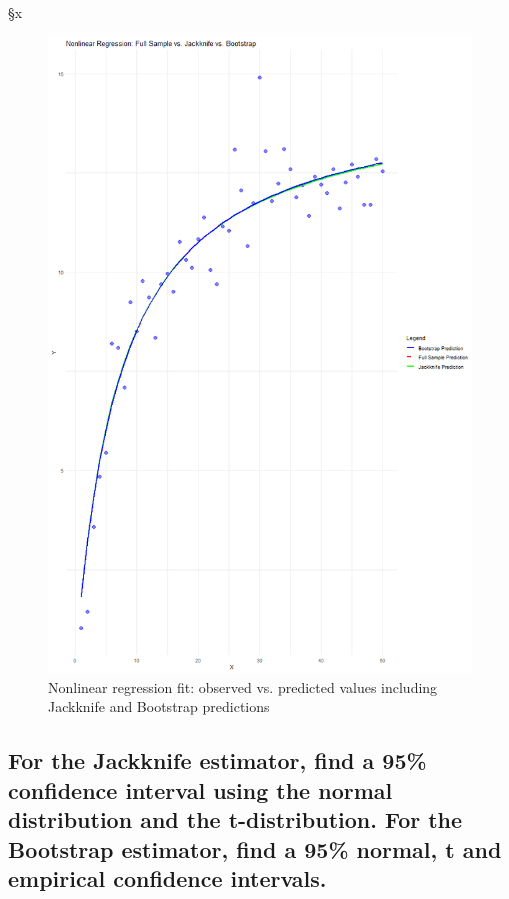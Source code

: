 §x\documentclass[]{article}
\begin{document}
\begin{figure}[H]
	\centering
	\includegraphics[width=0.7\linewidth]{img/img-4-1-2}
	\caption{Nonlinear regression fit: observed vs. predicted values including Jackknife and Bootstrap predictions}
	\label{fig:img-4-1-2}
\end{figure}

\subsection{For the Jackknife estimator, find a 95\% confidence interval using the normal distribution and the t-distribution. For the Bootstrap estimator, find a 95\% normal, t and empirical confidence intervals.}
\end{document}
